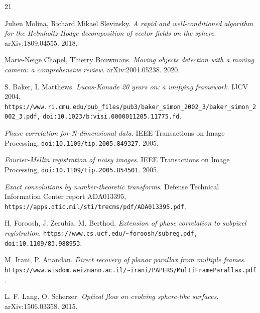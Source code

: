 \backmatter
{}
\begin{thebibliography}{21}

Julien Molina, Richard Mikael Slevinsky. \emph{A rapid and well-conditioned algorithm for the Helmholtz-Hodge decomposition of vector fields on the sphere}. arXiv:1809.04555. 2018.

Marie-Neige Chapel, Thierry Bouwmans. \emph{Moving objects detection with a moving camera: a comprehensive review}. arXiv:2001.05238. 2020.

S. Baker, I. Matthews. \emph{Lucas-Kanade 20 years on: a unifying framework}. IJCV 2004, \texttt{https:/\allowbreak{}/\allowbreak{}www.ri.cmu.edu/\allowbreak{}pub\_\allowbreak{}files/\allowbreak{}pub3/\allowbreak{}baker\_\allowbreak{}simon\_\allowbreak{}2002\_\allowbreak{}3/\allowbreak{}baker\_\allowbreak{}simon\_\allowbreak{}2002\_\allowbreak{}3.pdf,} \texttt{doi:10.1023/\allowbreak{}b:visi.0000011205.11775.fd}.

\emph{Phase correlation for N-dimensional data}. IEEE Transactions on Image Processing, \texttt{doi:10.1109/\allowbreak{}tip.2005.849327}. 2005.

\emph{Fourier-Mellin registration of noisy images}. IEEE Transactions on Image Processing, \texttt{doi:10.1109/\allowbreak{}tip.2005.854501}. 2005.

\emph{Exact convolutions by number-theoretic transforms}. Defense Technical Information Center report ADA013395, \texttt{https:/\allowbreak{}/\allowbreak{}apps.dtic.mil/\allowbreak{}sti/\allowbreak{}trecms/\allowbreak{}pdf/\allowbreak{}ADA013395.pdf}.

H. Foroosh, J. Zerubia, M. Berthod. \emph{Extension of phase correlation to subpixel registration}. \texttt{https:/\allowbreak{}/\allowbreak{}www.cs.ucf.edu/\allowbreak{}\textasciitilde{}foroosh/\allowbreak{}subreg.pdf,} \texttt{doi:10.1109/\allowbreak{}83.988953}.

M. Irani, P. Anandan. \emph{Direct recovery of planar parallax from multiple frames}. \texttt{https:/\allowbreak{}/\allowbreak{}www.wisdom.weizmann.ac.il/\allowbreak{}\textasciitilde{}irani/\allowbreak{}PAPERS/\allowbreak{}MultiFrameParallax.pdf}.

L. F. Lang, O. Scherzer. \emph{Optical flow on evolving sphere-like surfaces}. arXiv:1506.03358. 2015.


\end{thebibliography}
